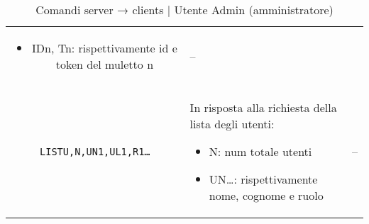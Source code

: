 \begin{table}[h!]
\begin{tabular}{|c|p{8cm}|c|}
\begin{itemize}
                \item IDn, Tn: rispettivamente id e token del muletto n
            \end{itemize}
            & -- \\

            \texttt{LISTU,N,UN1,UL1,R1…} & In risposta alla richiesta della lista degli utenti:
            \begin{itemize}
                \item N: num totale utenti

                \item UN…: rispettivamente nome, cognome e ruolo
            \end{itemize}
            & -- \\


            \hline
        \end{tabular}
        \caption{Comandi server → clients | Utente Admin (amministratore)}
    \end{table}


\begin{comment}
\begin{longtable}[h!]{|p{2cm}|p{8cm}|p{2cm}|}
\hline
\rowcolorhead
\multicolumn{3}{|c|}{\headertitle{FORKLIFTS}}\\
\hline
\rowcolorhead
\headertitle{Comando} & \headertitle{Descrizione} & \headertitle{Risposta} \\
\hline
POS,X,Y,DIR & posizione attuale del muletto, considerando la mappa come una matrice:\newline
\begin{itemize}
\item     X: riga della matrice
\item     Y: colonna ““
\item     DIR: orientamento assoluto secondo enum Orientation
\end{itemize}

& -- \\
LIST & richiede nuova lista di task da completare & LIST... \\




\caption{prova}
\end{longtable}
\end{comment}














